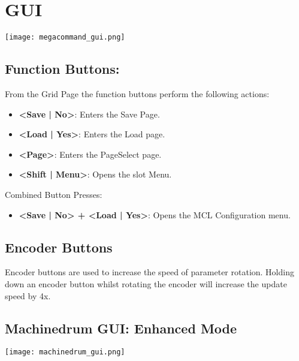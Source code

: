 \chapter{GUI}
\begin{center}
   \texttt{[image: megacommand\_gui.png]}
\end{center}
\section{Function Buttons:}
From the Grid Page the function buttons perform the following actions:
\begin{itemize}
\item{\textbf{<Save | No>}: Enters the Save Page.}
\item{\textbf{<Load | Yes>}: Enters the Load page.}
\item{\textbf{<Page>}: Enters the PageSelect page.}
\item{\textbf{<Shift | Menu>}: Opens the slot Menu. }
\end{itemize}
Combined Button Presses:
\begin{itemize}
\item{\textbf{<Save | No> + <Load | Yes>}: Opens the MCL Configuration menu. }
\end{itemize}

\section{Encoder Buttons}
Encoder buttons are used to increase the speed of parameter rotation.
Holding down an encoder button whilst rotating the encoder will increase the update speed by 4x.

\newpage
\section{Machinedrum GUI: Enhanced Mode}
\texttt{[image: machinedrum\_gui.png]}

